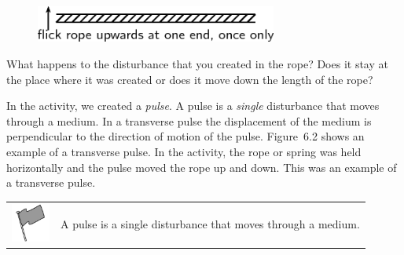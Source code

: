     \setcounter{subfigure}{0}


	\begin{figure}[H] %
    \begin{center}
    \label{m38801*id312882!!!underscore!!!media}\label{m38801*id312882!!!underscore!!!printimage}\includegraphics[width=300px]{col11305.imgs/m38801_PG10C4_001.png} %
        
      \vspace{2pt}
    \vspace{.1in}
    
    \end{center}

 \end{figure}   

    \addtocounter{footnote}{-0}
    
      \par 
      \label{m38801*id312888}What happens to the disturbance that you created in the rope? Does it stay at the place where it was created or does it move down the length of the rope? \par 

      \label{m38801*id312898}In the activity, we created a \textsl{pulse}. A pulse is a \textsl{single} disturbance that moves through a medium. In a transverse pulse the displacement of the medium is perpendicular to the direction of motion of the pulse. Figure~6.2 shows an example of a transverse pulse. In the activity, the rope or spring was held horizontally and the pulse moved the rope up and down. This was an example of a transverse pulse.\par 
\label{m38801*fhsst!!!underscore!!!id71}\begin{definition}
	  \begin{tabular*}{15 cm}{m{15 mm}m{}}
	\hspace*{-50pt}  \includegraphics[width=0.5in]{col11305.imgs/psflag2.png}   & \Definition{   \label{id2434846}\textbf{ Pulse }} { \label{m38801*meaningfhsst!!!underscore!!!id71}
      \label{m38801*id312926}A pulse is a single disturbance that moves through a medium. \par 
       } 
      \end{tabular*}
      \end{definition}

